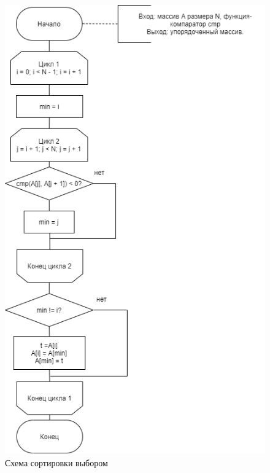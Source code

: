 \documentclass[12pt]{report}
\begin{document}
\begin{figure}[H]
	\raggedleft
	\includegraphics[width=0.75\linewidth]{ssort.png}
	\caption{Схема сортировки выбором}
	\label{sels}
\end{figure}
\end{document}
